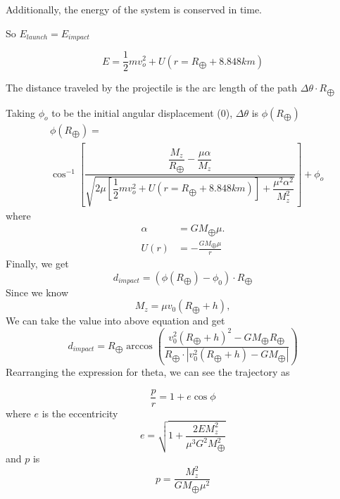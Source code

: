 \documentclass[%
 reprint,
 amsmath,amssymb,
 aps,
]{revtex4-1}
\begin{document}
Additionally, the energy of the system is conserved in time.

So $E_{launch} = E_{impact}$

\begin{equation*}
E = \dfrac{1}{2}mv_o^2 + U(r=R_\bigoplus+8.848km)    
\end{equation*}

The distance traveled by the projectile is the arc length of the path $\Delta\theta\cdot R_\bigoplus$

Taking $\phi_o$ to be the initial angular displacement (0), $\Delta\theta$ is $\phi\left(R_\bigoplus\right)$
\begin{equation*}
\begin{aligned}
&\phi(R_{\bigoplus}) = \\&\cos^{-1}\left[\dfrac{\dfrac{M_z}{R_\bigoplus}-\dfrac{\mu\alpha}{M_z}}{\sqrt{2\mu \left[\dfrac{1}{2}mv_o^2 + U(r=R_\bigoplus+8.848km)\right] + \dfrac{\mu^2\alpha^2}{M_z^2}}}\right] + \phi_o  
\end{aligned}
\end{equation*}
where
\begin{equation*}
\begin{aligned}
    \alpha&=GM_{\bigoplus}\mu.
    \\U(r)&=-\frac{GM_{\bigoplus}\mu}{r}
\end{aligned}
\end{equation*}
Finally, we get
\begin{equation*}
d_{impact} = (\phi\left(R_\bigoplus\right)-\phi_0)\cdot R_\bigoplus    
\end{equation*}
Since we know
\begin{equation*}
    M_z=\mu v_0(R_{\bigoplus}+h),
\end{equation*}
We can take the value into above equation and get
\begin{equation*}
    d_{impact}=R_{\bigoplus}\arccos\left(\frac{v_0^2(R_{\bigoplus}+h)^2-GM_{\bigoplus}R_{\bigoplus}}{R_{\bigoplus}\cdot|v_0^2(R_{\bigoplus}+h)-GM_{\bigoplus}|}\right)
\end{equation*}
Rearranging the expression for theta, we can see the trajectory
as

\begin{equation*}
    \frac{p}{r}=1+e\cos{\phi}
\end{equation*}
where $e$ is the eccentricity
\begin{equation*}
    e=\sqrt{1+\frac{2EM_z^2}{\mu^3 G^2M^2_{\bigoplus}}}
\end{equation*}
and $p$ is 
\begin{equation*}
    p=\frac{M_z^2}{GM_{\bigoplus}\mu^2}
\end{equation*}
\end{document}
